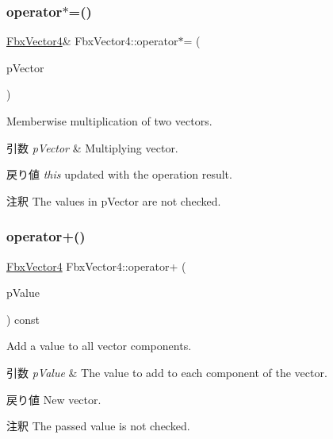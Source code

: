 \subsubsection{\texorpdfstring{operator$\ast$=()}{operator*=()}\hspace{0.1cm}{\footnotesize\ttfamily [2/2]}}
{\footnotesize\ttfamily \hyperlink{class_fbx_vector4}{Fbx\+Vector4}\& Fbx\+Vector4\+::operator$\ast$= (\begin{DoxyParamCaption}\item[{const \hyperlink{class_fbx_vector4}{Fbx\+Vector4} \&}]{p\+Vector }\end{DoxyParamCaption})}

Memberwise multiplication of two vectors. 
\begin{DoxyParams}{引数}
{\em p\+Vector} & Multiplying vector. \\
\hline
\end{DoxyParams}
\begin{DoxyReturn}{戻り値}
{\itshape this} updated with the operation result. 
\end{DoxyReturn}
\begin{DoxyRemark}{注釈}
The values in p\+Vector are not checked. 
\end{DoxyRemark}
\mbox{\label{class_fbx_vector4_a4a3e913f9e722a63bc23cc0fe324965e}} 
\subsubsection{\texorpdfstring{operator+()}{operator+()}\hspace{0.1cm}{\footnotesize\ttfamily [1/2]}}
{\footnotesize\ttfamily \hyperlink{class_fbx_vector4}{Fbx\+Vector4} Fbx\+Vector4\+::operator+ (\begin{DoxyParamCaption}\item[{double}]{p\+Value }\end{DoxyParamCaption}) const}

Add a value to all vector components. 
\begin{DoxyParams}{引数}
{\em p\+Value} & The value to add to each component of the vector. \\
\hline
\end{DoxyParams}
\begin{DoxyReturn}{戻り値}
New vector. 
\end{DoxyReturn}
\begin{DoxyRemark}{注釈}
The passed value is not checked. 
\end{DoxyRemark}
\mbox{\label{class_fbx_vector4_aa85736514639224c7e1057facc73a040}} 
